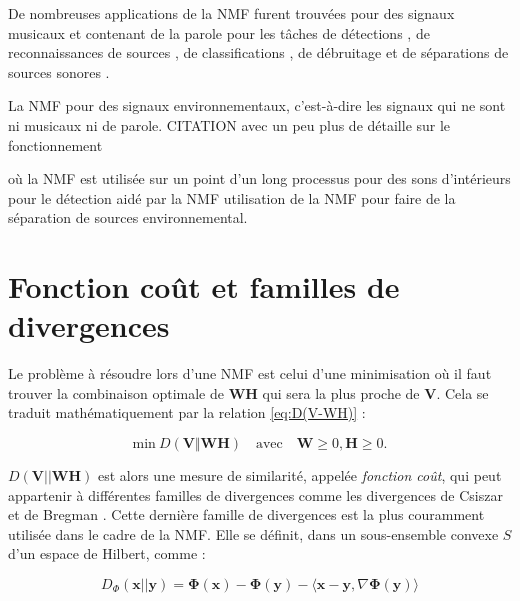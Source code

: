 De nombreuses applications de la NMF furent trouvées pour des signaux musicaux et contenant de la parole pour les tâches de détections \cite{dessein2013real}, de reconnaissances de sources \cite{gemmeke2013exemplar}, de classifications \cite{benetos2006musical}, de débruitage \cite{wilson_speech_2008} et de séparations de sources sonores \cite{virtanen_monaural_2007}. 

La NMF pour des signaux environnementaux, c'est-à-dire les signaux qui ne sont ni musicaux ni de parole. 
 CITATION avec un peu plus de détaille sur le fonctionnement
 
\cite{ghoraani2011time} où la NMF est utilisée sur un point d'un long processus 
\cite{gemmeke2013exemplar} pour des sons d'intérieurs 
\cite{mesaros_sound_2015} pour le détection aidé par la NMF
\cite{satoshi_innami_nmf-based_2012} utilisation de la NMF pour faire de la séparation de sources environnemental.

\section{Fonction coût et familles de divergences}

Le problème à résoudre lors d'une NMF est celui d'une minimisation où il faut trouver la combinaison optimale de $\mathbf{WH}$ qui sera la plus proche de $\mathbf{V}$. Cela se traduit mathématiquement par la relation \ref{eq:D(V-WH)} : 
 
\begin{equation}\label{eq:D(V-WH)}
\text{min}~D\left(\textbf{V} \Vert \textbf{WH}\right) \quad \text{avec} \quad \mathbf{W} \geq 0, \mathbf{H} \geq 0.
\end{equation}

$D\left(\textbf{V} \vert\vert \textbf{WH}\right)$ est alors une mesure de similarité, appelée \textit{fonction coût}, qui peut appartenir à différentes familles de divergences comme les divergences de Csiszar \cite{cichocki2006csiszar} et de Bregman \cite{bregman_relaxation_1967, dhillon_generalized_2005}. Cette dernière famille de divergences est la plus couramment utilisée dans le cadre de la NMF. Elle se définit, dans un sous-ensemble convexe $S$ d'un espace de Hilbert, comme : 

\begin{equation}\label{eq:Bregdiv}
D_{\Phi}(\textbf{x}\vert\vert \textbf{y}) = 
\mathbf{\Phi}(\mathbf{x}) - \mathbf{\Phi}(\mathbf{y}) - 
\langle\mathbf{x}-\mathbf{y},\nabla\mathbf{\Phi}(\mathbf{y})\rangle
\end{equation}

